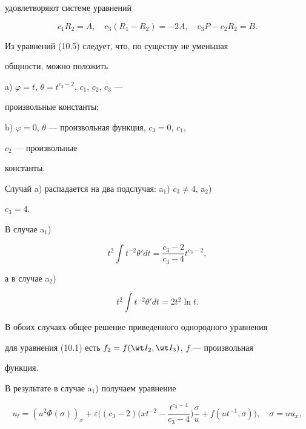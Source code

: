 удовлетворяют системе уравнений 


\begin{equation} 


c_1R_2=A,\quad c_3(R_1-R_2)=-2A,\quad 


c_3P-c_2R_2=B. \tag{10.5} 


\end{equation} 


 


Из уравнений (10.5) следует, что, по существу не уменьшая 


общности, можно положить 


 


a) $\varphi=t$, $\theta=t^{c_3-2}$, $c_1$, $c_2$, $c_3$ --- 


произвольные константы; 


 


b) $\varphi=0$, $\theta$ --- произвольная функция, $c_3=0$, $c_1$, 


$c_2$ --- произвольные 


константы. 


 


Случай a) распадается на два подслучая: a$_1$) $c_3\ne4$, a$_2$) 


$c_3=4$. 


В случае a$_1$) 


$$ 


t^2\int t^{-2}\theta'dt=\frac{c_3-2}{c_3-4}t^{c_3-2}, 


$$ 


а в случае a$_2$) 


$$ 


t^2\int t^{-2}\theta'dt=2t^2\ln t. 


$$ 


В обоих случаях общее решение приведенного однородного уравнения 


для уравнения (10.1) есть $f_2=f(\wt I_2,\wt I_3)$, $f$ --- произвольная 


функция. 


 


В результате в случае a$_1$) получаем уравнение 


\begin{equation} 


u_t=(u^2\Phi(\sigma))_x+\varepsilon\bigg((c_3-2)\bigg( 


x t^{-2}-\frac{t^{c_3-4}}{c_3-4}\bigg)\frac{\sigma}{u}+ 


f(u t^{-1},\sigma)\bigg),\quad \sigma=u u_x,\tag{10.6} 


\end{equation} 


